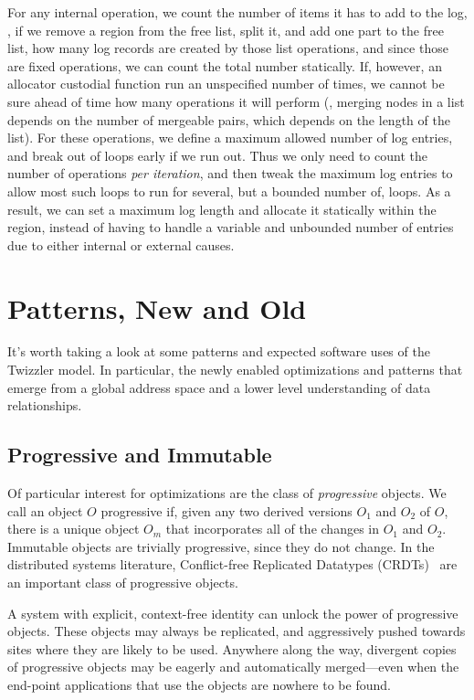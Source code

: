 For any internal operation, we count the number of items it has to add to the log, \eg, if we remove a region from the
free list, split it, and add one part to the free list, how many log records are created by those list operations, and
since those are fixed operations, we can count the total number statically. If, however, an allocator custodial function
run an unspecified number of times, we cannot be sure ahead of time how many operations it will perform (\eg, merging
nodes in a list depends on the number of mergeable pairs, which depends on the length of the list). For these
operations, we define a maximum allowed number of log entries, and break out of loops early if we run out. Thus we only
need to count the number of operations \emph{per iteration}, and then tweak the maximum log entries to allow most such
loops to run for several, but a bounded number of, loops. As a result, we can set a maximum log length and allocate it
statically within the region, instead of having to handle a variable and unbounded number of entries due to either
internal or external causes.

\section{Patterns, New and Old}

It's worth taking a look at some patterns and expected software uses of the Twizzler model. In particular, the newly
enabled optimizations and patterns that emerge from a global address space and a lower level understanding of data relationships.

\subsection{Progressive and Immutable}

Of particular interest for optimizations are the class of \emph{progressive} objects.
We call an object $O$ progressive if,
given any two derived versions $O_1$ and $O_2$ of $O$, there is a unique object $O_m$ that incorporates all of the changes in $O_1$ and $O_2$.
Immutable objects are trivially progressive, since they do not change.
In the distributed systems literature, Conflict-free Replicated Datatypes
(CRDTs)~\cite{shapiro2011comprehensive}
are an important class of progressive objects.

A system with explicit, context-free identity can unlock the power of progressive objects.
These objects may always be replicated, and aggressively pushed towards
sites where they are likely to be used.
Anywhere along the way, divergent copies of progressive objects may be eagerly and automatically
merged---even when the end-point applications that use the objects are nowhere to be found.


